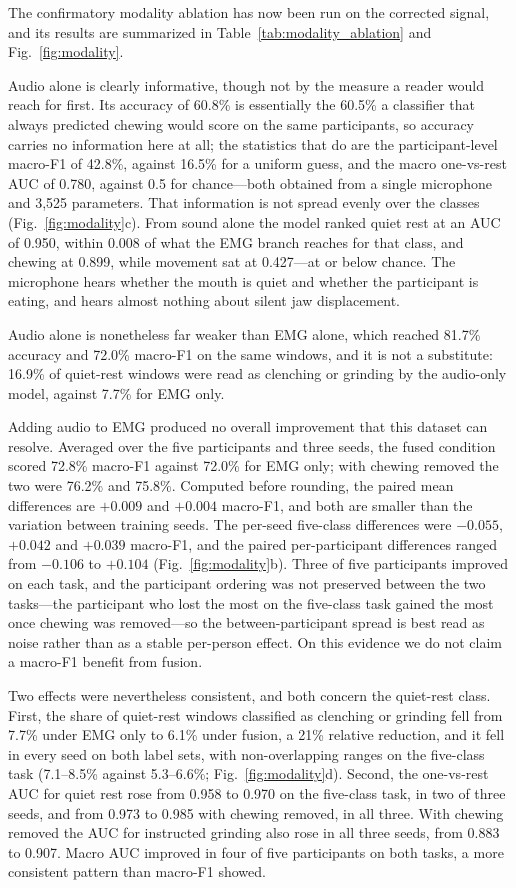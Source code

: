 \documentclass[pdflatex,sn-nature,iicol]{sn-jnl}
\begin{document}
The confirmatory modality ablation has now been run on the corrected signal, and its results are summarized in Table~\ref{tab:modality_ablation} and Fig.~\ref{fig:modality}.

Audio alone is clearly informative, though not by the measure a reader would reach for first. Its accuracy of 60.8\% is essentially the 60.5\% a classifier that always predicted chewing would score on the same participants, so accuracy carries no information here at all; the statistics that do are the participant-level macro-F1 of 42.8\%, against 16.5\% for a uniform guess, and the macro one-vs-rest AUC of 0.780, against 0.5 for chance---both obtained from a single microphone and 3,525 parameters. That information is not spread evenly over the classes (Fig.~\ref{fig:modality}c). From sound alone the model ranked quiet rest at an AUC of 0.950, within 0.008 of what the EMG branch reaches for that class, and chewing at 0.899, while movement sat at 0.427---at or below chance. The microphone hears whether the mouth is quiet and whether the participant is eating, and hears almost nothing about silent jaw displacement.

Audio alone is nonetheless far weaker than EMG alone, which reached 81.7\% accuracy and 72.0\% macro-F1 on the same windows, and it is not a substitute: 16.9\% of quiet-rest windows were read as clenching or grinding by the audio-only model, against 7.7\% for EMG only.

Adding audio to EMG produced no overall improvement that this dataset can resolve. Averaged over the five participants and three seeds, the fused condition scored 72.8\% macro-F1 against 72.0\% for EMG only; with chewing removed the two were 76.2\% and 75.8\%. Computed before rounding, the paired mean differences are $+0.009$ and $+0.004$ macro-F1, and both are smaller than the variation between training seeds. The per-seed five-class differences were $-0.055$, $+0.042$ and $+0.039$ macro-F1, and the paired per-participant differences ranged from $-0.106$ to $+0.104$ (Fig.~\ref{fig:modality}b). Three of five participants improved on each task, and the participant ordering was not preserved between the two tasks---the participant who lost the most on the five-class task gained the most once chewing was removed---so the between-participant spread is best read as noise rather than as a stable per-person effect. On this evidence we do not claim a macro-F1 benefit from fusion.

Two effects were nevertheless consistent, and both concern the quiet-rest class. First, the share of quiet-rest windows classified as clenching or grinding fell from 7.7\% under EMG only to 6.1\% under fusion, a 21\% relative reduction, and it fell in every seed on both label sets, with non-overlapping ranges on the five-class task (7.1--8.5\% against 5.3--6.6\%; Fig.~\ref{fig:modality}d). Second, the one-vs-rest AUC for quiet rest rose from 0.958 to 0.970 on the five-class task, in two of three seeds, and from 0.973 to 0.985 with chewing removed, in all three. With chewing removed the AUC for instructed grinding also rose in all three seeds, from 0.883 to 0.907. Macro AUC improved in four of five participants on both tasks, a more consistent pattern than macro-F1 showed.
\end{document}
